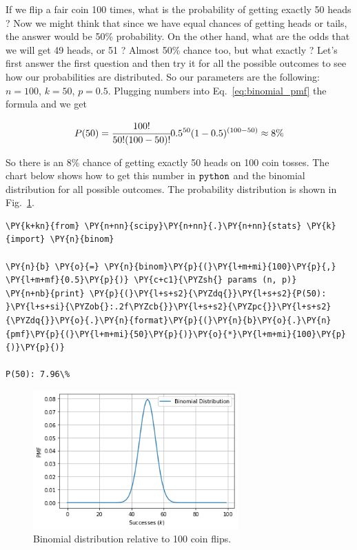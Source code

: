 If we flip a fair coin 100 times, what is the probability of getting
exactly 50 heads ? Now we might think that since we have equal chances
of getting heads or tails, the answer would be 50\% probability. On the
other hand, what are the odds that we will get 49 heads, or 51 ? Almost
50\% chance too, but what exactly ? Let's first answer the first
question and then try it for all the possible outcomes to see how our
probabilities are distributed. So our parameters are the following:
\(n = 100\), \(k = 50\), \(p = 0.5\). Plugging numbers into Eq.~\ref{eq:binomial_pmf} the formula
and we get

\[P(50) = \cfrac{100!}{50!(100 - 50)!}0.5^{50}(1-0.5)^{(100-50)} \approx 8\% \]

So there is an 8\% chance of getting exactly 50 heads on 100 coin
tosses. The chart below shows how to get this number in \(\tt{python}\)
and the binomial distribution for all possible outcomes. The probability distribution
is shown in Fig.~\ref{fig:binomial_coin_flip}.

\begin{codebox}
\begin{Verbatim}[commandchars=\\\{\}]
\PY{k+kn}{from} \PY{n+nn}{scipy}\PY{n+nn}{.}\PY{n+nn}{stats} \PY{k}{import} \PY{n}{binom}

\PY{n}{b} \PY{o}{=} \PY{n}{binom}\PY{p}{(}\PY{l+m+mi}{100}\PY{p}{,} \PY{l+m+mf}{0.5}\PY{p}{)} \PY{c+c1}{\PYZsh{} params (n, p)}
\PY{n+nb}{print} \PY{p}{(}\PY{l+s+s2}{\PYZdq{}}\PY{l+s+s2}{P(50): }\PY{l+s+si}{\PYZob{}:.2f\PYZcb{}}\PY{l+s+s2}{\PYZpc{}}\PY{l+s+s2}{\PYZdq{}}\PY{o}{.}\PY{n}{format}\PY{p}{(}\PY{n}{b}\PY{o}{.}\PY{n}{pmf}\PY{p}{(}\PY{l+m+mi}{50}\PY{p}{)}\PY{o}{*}\PY{l+m+mi}{100}\PY{p}{)}\PY{p}{)}

P(50): 7.96\%
\end{Verbatim}
\end{codebox}

\begin{figure}[ht]
\centering
    \includegraphics[width=0.7\textwidth]{figures/binomial_2_0.png}
    \caption{Binomial distribution relative to 100 coin flips.}
    \label{fig:binomial_coin_flip}
\end{figure}
    
